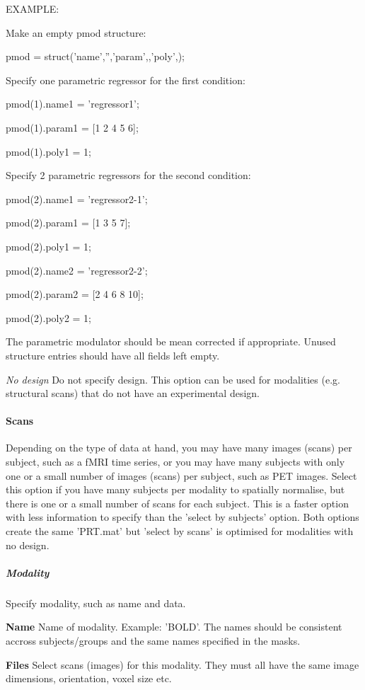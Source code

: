 EXAMPLE:

Make an empty pmod structure: 

  pmod = struct('name',{''},'param',{},'poly',{});

Specify one parametric regressor for the first condition: 

  pmod(1).name{1}  = 'regressor1';

  pmod(1).param{1} = [1 2 4 5 6];

  pmod(1).poly{1}  = 1;

Specify 2 parametric regressors for the second condition: 

  pmod(2).name{1}  = 'regressor2-1';

  pmod(2).param{1} = [1 3 5 7]; 

  pmod(2).poly{1}  = 1;

  pmod(2).name{2}  = 'regressor2-2';

  pmod(2).param{2} = [2 4 6 8 10];

  pmod(2).poly{2}  = 1;



The parametric modulator should be mean corrected if appropriate. Unused structure entries should have all fields left empty.


\textsl{No design}
Do not specify design. This option can be used for modalities (e.g. structural scans) that do not have an experimental design.


\paragraph{Scans}
Depending on the type of data at hand, you may have many images (scans) per subject, such as a fMRI time series, or you may have many subjects with only one or a small number of images (scans) per subject, such as PET images. Select this option if you have many subjects per modality to spatially normalise, but there is one or a small number of scans for each subject. This is a faster option with less information to specify than the 'select by subjects' option. Both options create the same 'PRT.mat' but 'select by scans' is optimised for modalities with no design.


\subparagraph{Modality}
Specify modality, such as name and data.


\textbf{Name}
Name of modality. Example: 'BOLD'. The names should be consistent accross subjects/groups and the same names specified in the masks.


\textbf{Files}
Select scans (images) for this modality. They must all have the same image dimensions, orientation, voxel size etc.


